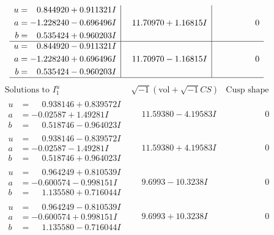 \documentclass[1p]{elsarticle_modified}
\theoremstyle{definition}
\newcommand{\I}{\sqrt{-1}}
\begin{document}
$$\begin{array}{c|c|c}
\begin{aligned}
u &= \phantom{-}0.844920 + 0.911321 I \\
a &= -1.228240 - 0.696496 I \\
b &= \phantom{-}0.535424 + 0.960203 I\end{aligned}
 & \phantom{-}11.70970 + 1.16815 I & \phantom{-0.000000 } 0 \\ \hline\begin{aligned}
u &= \phantom{-}0.844920 - 0.911321 I \\
a &= -1.228240 + 0.696496 I \\
b &= \phantom{-}0.535424 - 0.960203 I\end{aligned}
 & \phantom{-}11.70970 - 1.16815 I & \phantom{-0.000000 } 0\\
 \hline 
 \end{array}$$\newpage$$\begin{array}{c|c|c}  
\text{Solutions to }I^u_{1}& \I (\text{vol} + \sqrt{-1}CS) & \text{Cusp shape}\\
 \hline 
\begin{aligned}
u &= \phantom{-}0.938146 + 0.839572 I \\
a &= -0.02587 + 1.49281 I \\
b &= \phantom{-}0.518746 - 0.964023 I\end{aligned}
 & \phantom{-}11.59380 - 4.19583 I & \phantom{-0.000000 } 0 \\ \hline\begin{aligned}
u &= \phantom{-}0.938146 - 0.839572 I \\
a &= -0.02587 - 1.49281 I \\
b &= \phantom{-}0.518746 + 0.964023 I\end{aligned}
 & \phantom{-}11.59380 + 4.19583 I & \phantom{-0.000000 } 0 \\ \hline\begin{aligned}
u &= \phantom{-}0.964249 + 0.810539 I \\
a &= -0.600574 - 0.998151 I \\
b &= \phantom{-}1.135580 + 0.716044 I\end{aligned}
 & \phantom{-}9.6993 - 10.3238 I & \phantom{-0.000000 } 0 \\ \hline\begin{aligned}
u &= \phantom{-}0.964249 - 0.810539 I \\
a &= -0.600574 + 0.998151 I \\
b &= \phantom{-}1.135580 - 0.716044 I\end{aligned}
 & \phantom{-}9.6993 + 10.3238 I & \phantom{-0.000000 } 0 \\ \hline\begin{aligned}

\end{aligned}
\end{array}$$
\end{document}
